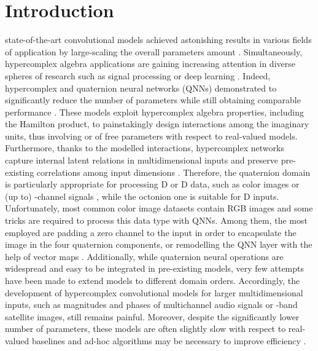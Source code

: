 \documentclass[lettersize,journal]{IEEEtran}
\begin{document}
\section{Introduction}
\label{sec:intro}

 state-of-the-art convolutional models achieved astonishing results in various fields of application by large-scaling the overall parameters amount \cite{karras2020analyzing, dascoli2021convit, dosovitskiy2021image, Real2019ImgClass}. Simultaneously, hypercomplex algebra applications are gaining increasing attention in diverse spheres of research such as signal processing \cite{NAVARROMORENO2021108022, NAVARROMORENO202010100, Sanei2018ICASSP, XIANG2018193} or deep learning \cite{Kamayashi2021TNNLS, Lin2021TNNLS, Liu2021TNNLS, Valle2018TNNLS, Liu2018TNNLS, VALLE2020136, DECASTRO202054, PaulTNNLS2015, Hirose2014SSTNNLS}. Indeed, hypercomplex and quaternion neural networks (QNNs) demonstrated to significantly reduce the number of parameters while still obtaining comparable performance \cite{Muppidi2021ICASSP, ParcolletICLR2019, GrassucciQGAN2021, Tay2019QTRansformer, Cariow2021Oct, WU2020179, VALLE2021111}. These models exploit hypercomplex algebra properties, including the Hamilton product, to painstakingly design interactions among the imaginary units, thus involving  or  of free parameters with respect to real-valued models. Furthermore, thanks to the modelled interactions, hypercomplex networks capture internal latent relations in multidimensional inputs and preserve pre-existing correlations among input dimensions \cite{Chen2021QFM, GrassucciICASSP2021, Grassucci2021Entropy, Gai2021TCS, Vieira2020IJCNN}. Therefore, the quaternion domain is particularly appropriate for processing D or D data, such as color images or (up to) -channel signals \cite{Took2019ICASSP}, while the octonion one is suitable for D inputs. Unfortunately, most common color image datasets contain RGB images and some tricks are required to process this data type with QNNs. Among them, the most employed are padding a zero channel to the input in order to encapsulate the image in the four quaternion components, or remodelling the QNN layer with the help of vector maps \cite{Gaudet2021RemDim}. Additionally, while quaternion neural operations are widespread and easy to be integrated in pre-existing models, very few attempts have been made to extend models to different domain orders. Accordingly, the development of hypercomplex convolutional models for larger multidimensional inputs, such as magnitudes and phases of multichannel audio signals or -band satellite images, still remains painful. Moreover, despite the significantly lower number of parameters, these models are often slightly slow with respect to real-valued baselines \cite{hoffmann2020algebranets} and ad-hoc algorithms may be necessary to improve efficiency \cite{Cariow2021Quat, Cariow2021Oct}.
\end{document}
